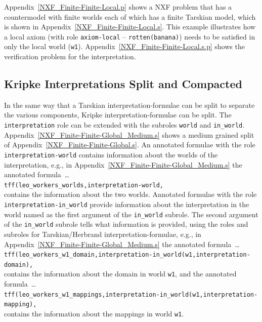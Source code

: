 \documentclass{easychair}
\newcommand{\smalltt}[1]{\small \texttt{#1}}
\begin{document}
Appendix~\ref{NXF_Finite-Finite-Local.p} shows a NXF problem that has a countermodel with
finite worlds each of which has a finite Tarskian model, which is shown in
Appendix~\ref{NXF_Finite-Finite-Local.s}.
This example illustrates how a local axiom (with role {\tt axiom-local} -- {\tt rotten(banana)})
needs to be satisfied in only the local world ({\tt w1}).
Appendix~\ref{NXF_Finite-Finite-Local.s.p} shows the verification problem for the interpretation.

\subsection{Kripke Interpretations Split and Compacted}
\label{NewKripkeSplitCompact}

In the same way that a Tarskian interpretation-formulae can be split to separate the various 
components, Kripke interpretation-formulae can be split.
The {\tt interpretation} role can be extended with the subroles {\tt world} and {\tt in\_world}.
Appendix~\ref{NXF_Finite-Finite-Global_Medium.s} shows a medium grained split of 
Appendix~\ref{NXF_Finite-Finite-Global.s}.
An annotated formulae with the role {\tt interpretation-world} contains information about the
worlds of the interpretation, e.g., in Appendix~\ref{NXF_Finite-Finite-Global_Medium.s} the
annotated formula~\ldots \\
\hspace*{0.5cm}\smalltt{tff(leo\_workers\_worlds,interpretation-world,} \\
contains the information about the two worlds.
Annotated formulae with the role {\tt interpretation-in\_world} provide information about the
interpretation in the world named as the first argument of the {\tt in\_world} subrole.
The second argument of the {\tt in\_world} subrole tells what information is provided, using the
roles and subroles for Tarskian/Herbrand interpretation-formulae, e.g., in 
Appendix~\ref{NXF_Finite-Finite-Global_Medium.s} the annotated formula~\ldots \\
\hspace*{0.5cm}\smalltt{tff(leo\_workers\_w1\_domain,interpretation-in\_world(w1,interpretation-domain),} \\
contains the information about the domain in world {\tt w1}, and the annotated formula~\ldots \\
\hspace*{0.5cm}\smalltt{tff(leo\_workers\_w1\_mappings,interpretation-in\_world(w1,interpretation-mapping),} \\
contains the information about the mappings in world {\tt w1}.
\end{document}
